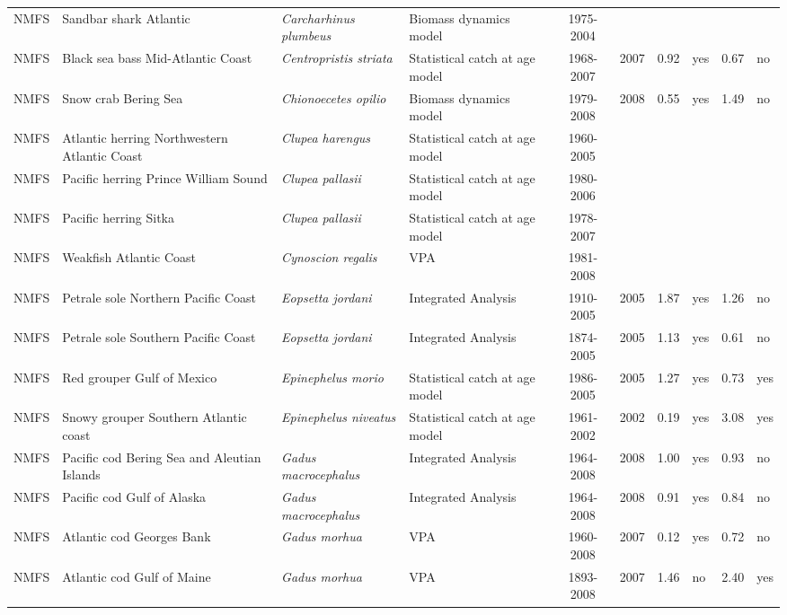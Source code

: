 \begin{longtable}{p{1.8cm}p{3.5cm}p{3.5cm}p{3cm}cccp{0.9cm}cp{0.9cm}}
  NMFS & Sandbar shark Atlantic & \textit{Carcharhinus plumbeus} & Biomass dynamics model & 1975-2004 &  &  &  &  &  \\ 
  NMFS & Black sea bass Mid-Atlantic Coast & \textit{Centropristis striata} & Statistical catch at age model & 1968-2007 & 2007 & 0.92 & yes & 0.67 & no \\ 
  NMFS & Snow crab Bering Sea & \textit{Chionoecetes opilio} & Biomass dynamics model & 1979-2008 & 2008 & 0.55 & yes & 1.49 & no \\ 
  NMFS & Atlantic herring Northwestern Atlantic Coast & \textit{Clupea harengus} & Statistical catch at age model & 1960-2005 &  &  &  &  &  \\ 
  NMFS & Pacific herring Prince William Sound & \textit{Clupea pallasii} & Statistical catch at age model & 1980-2006 &  &  &  &  &  \\ 
  NMFS & Pacific herring Sitka & \textit{Clupea pallasii} & Statistical catch at age model & 1978-2007 &  &  &  &  &  \\ 
  NMFS & Weakfish Atlantic Coast & \textit{Cynoscion regalis} & VPA & 1981-2008 &  &  &  &  &  \\ 
  NMFS & Petrale sole Northern Pacific Coast & \textit{Eopsetta jordani} & Integrated Analysis & 1910-2005 & 2005 & 1.87 & yes & 1.26 & no \\ 
  NMFS & Petrale sole Southern Pacific Coast & \textit{Eopsetta jordani} & Integrated Analysis & 1874-2005 & 2005 & 1.13 & yes & 0.61 & no \\ 
  NMFS & Red grouper Gulf of Mexico & \textit{Epinephelus morio} & Statistical catch at age model & 1986-2005 & 2005 & 1.27 & yes & 0.73 & yes \\ 
  NMFS & Snowy grouper Southern Atlantic coast & \textit{Epinephelus niveatus} & Statistical catch at age model & 1961-2002 & 2002 & 0.19 & yes & 3.08 & yes \\ 
  NMFS & Pacific cod Bering Sea and Aleutian Islands & \textit{Gadus macrocephalus} & Integrated Analysis & 1964-2008 & 2008 & 1.00 & yes & 0.93 & no \\ 
  NMFS & Pacific cod Gulf of Alaska & \textit{Gadus macrocephalus} & Integrated Analysis & 1964-2008 & 2008 & 0.91 & yes & 0.84 & no \\ 
  NMFS & Atlantic cod Georges Bank & \textit{Gadus morhua} & VPA & 1960-2008 & 2007 & 0.12 & yes & 0.72 & no \\ 
  NMFS & Atlantic cod Gulf of Maine & \textit{Gadus morhua} & VPA & 1893-2008 & 2007 & 1.46 & no & 2.40 & yes \\ 

\end{longtable}
